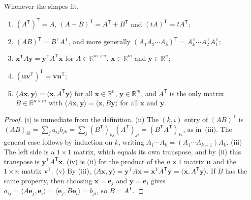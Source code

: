 \begin{proposition}
\label{prop:transpose-rules}
Whenever the shapes fit,
\begin{enumerate}
\item $(A^{\mathsf T})^{\mathsf T}=A$, $(A+B)^{\mathsf T}=A^{\mathsf T}+B^{\mathsf T}$ and $(tA)^{\mathsf T}=tA^{\mathsf T}$;
\item $(AB)^{\mathsf T}=B^{\mathsf T}A^{\mathsf T}$, and more generally $(A_1A_2\cdots A_k)^{\mathsf T}=A_k^{\mathsf T}\cdots A_2^{\mathsf T}A_1^{\mathsf T}$;
\item $\mathbf x^{\mathsf T}A\mathbf y=\mathbf y^{\mathsf T}A^{\mathsf T}\mathbf x$ for $A\in\mathbb R^{m\times n}$, $\mathbf x\in\mathbb R^m$ and $\mathbf y\in\mathbb R^n$;
\item $(\mathbf u\mathbf v^{\mathsf T})^{\mathsf T}=\mathbf v\mathbf u^{\mathsf T}$;
\item $\langle A\mathbf x,\mathbf y\rangle=\langle\mathbf x,A^{\mathsf T}\mathbf y\rangle$ for all $\mathbf x\in\mathbb R^n$, $\mathbf y\in\mathbb R^m$, and $A^{\mathsf T}$ is the only matrix $B\in\mathbb R^{n\times m}$ with $\langle A\mathbf x,\mathbf y\rangle=\langle\mathbf x,B\mathbf y\rangle$ for all $\mathbf x$ and $\mathbf y$.
\end{enumerate}
\end{proposition}

\begin{proof}
(i) is immediate from the definition. (ii) The $(k,i)$ entry of $(AB)^{\mathsf T}$ is $(AB)_{ik}=\sum_ja_{ij}b_{jk}=\sum_j(B^{\mathsf T})_{kj}(A^{\mathsf T})_{ji}=(B^{\mathsf T}A^{\mathsf T})_{ki}$, as in \,(iii). The general case follows by induction on $k$, writing $A_1\cdots A_k=(A_1\cdots A_{k-1})A_k$. (iii) The left side is a $1\times1$ matrix, which equals its own transpose, and by (ii) this transpose is $\mathbf y^{\mathsf T}A^{\mathsf T}\mathbf x$. (iv) is (ii) for the product of the $n\times1$ matrix $\mathbf u$ and the $1\times n$ matrix $\mathbf v^{\mathsf T}$. (v) By (iii), $\langle A\mathbf x,\mathbf y\rangle=\mathbf y^{\mathsf T}A\mathbf x=\mathbf x^{\mathsf T}A^{\mathsf T}\mathbf y=\langle\mathbf x,A^{\mathsf T}\mathbf y\rangle$. If $B$ has the same property, then choosing $\mathbf x=\mathbf e_j$ and $\mathbf y=\mathbf e_i$ gives $a_{ij}=\langle A\mathbf e_j,\mathbf e_i\rangle=\langle\mathbf e_j,B\mathbf e_i\rangle=b_{ji}$, so $B=A^{\mathsf T}$.
\end{proof}

